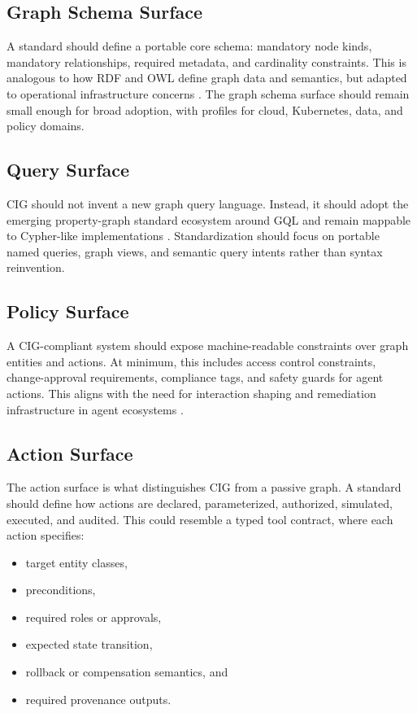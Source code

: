 \documentclass[conference]{IEEEtran}
\begin{document}
\subsection{Graph Schema Surface}
A standard should define a portable core schema: mandatory node kinds, mandatory relationships, required metadata, and cardinality constraints. This is analogous to how RDF and OWL define graph data and semantics, but adapted to operational infrastructure concerns \cite{w3c2014rdf,hogan2021kg}. The graph schema surface should remain small enough for broad adoption, with profiles for cloud, Kubernetes, data, and policy domains.

\subsection{Query Surface}
CIG should not invent a new graph query language. Instead, it should adopt the emerging property-graph standard ecosystem around GQL and remain mappable to Cypher-like implementations \cite{iso2024gql}. Standardization should focus on portable named queries, graph views, and semantic query intents rather than syntax reinvention.

\subsection{Policy Surface}
A CIG-compliant system should expose machine-readable constraints over graph entities and actions. At minimum, this includes access control constraints, change-approval requirements, compliance tags, and safety guards for agent actions. This aligns with the need for interaction shaping and remediation infrastructure in agent ecosystems \cite{hadfield2025infraagents}.

\subsection{Action Surface}
The action surface is what distinguishes CIG from a passive graph. A standard should define how actions are declared, parameterized, authorized, simulated, executed, and audited. This could resemble a typed tool contract, where each action specifies:
\begin{itemize}
    \item target entity classes,
    \item preconditions,
    \item required roles or approvals,
    \item expected state transition,
    \item rollback or compensation semantics, and
    \item required provenance outputs.
\end{itemize}
\end{document}
